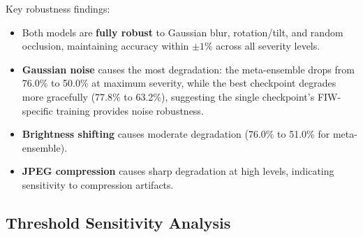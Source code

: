 \documentclass[journal,12pt]{IEEEtran}
\begin{document}
\begin{table}[t]
    \centering
    \caption{Robustness to image corruption on FIW (accuracy \%). Level 0
    is clean; Level 5 is maximum corruption.}
    \label{tab:robustness}
\end{table}

Key robustness findings:
\begin{itemize}
    \item Both models are \textbf{fully robust} to Gaussian blur,
          rotation/tilt, and random occlusion, maintaining accuracy within
          $\pm1\%$ across all severity levels.
    \item \textbf{Gaussian noise} causes the most degradation: the
          meta-ensemble drops from 76.0\% to 50.0\% at maximum severity,
          while the best checkpoint degrades more gracefully (77.8\% to
          63.2\%), suggesting the single checkpoint's FIW-specific training
          provides noise robustness.
    \item \textbf{Brightness shifting} causes moderate degradation (76.0\%
          to 51.0\% for meta-ensemble).
    \item \textbf{JPEG compression} causes sharp degradation at high
          levels, indicating sensitivity to compression artifacts.
\end{itemize}

\subsection{Threshold Sensitivity Analysis}
\label{sec:threshold}
\end{document}
